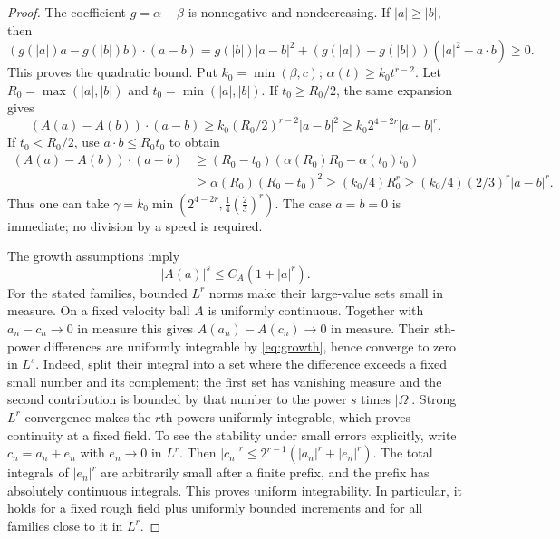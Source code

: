 \documentclass[11pt]{article}
\theoremstyle{remark}
\begin{document}
\begin{proof}
The coefficient $g=\alpha-\beta$ is nonnegative and nondecreasing.
If $|a|\ge|b|$, then
\[
 (g(|a|)a-g(|b|)b)\cdot(a-b)
 =g(|b|)|a-b|^2+(g(|a|)-g(|b|))(|a|^2-a\cdot b)\ge0.
\]
This proves the quadratic bound. Put $k_0=\min(\beta,c)$;
$\alpha(t)\ge k_0t^{r-2}$. Let $R_0=\max(|a|,|b|)$ and
$t_0=\min(|a|,|b|)$. If $t_0\ge R_0/2$, the same expansion gives
\[
 (A(a)-A(b))\cdot(a-b)
 \ge k_0(R_0/2)^{r-2}|a-b|^2
 \ge k_0 2^{4-2r}|a-b|^r.
\]
If $t_0<R_0/2$, use $a\cdot b\le R_0t_0$ to obtain
\begin{align*}
 (A(a)-A(b))\cdot(a-b)
 &\ge(R_0-t_0)(\alpha(R_0)R_0-\alpha(t_0)t_0)\\
 &\ge\alpha(R_0)(R_0-t_0)^2
 \ge(k_0/4)R_0^r
 \ge(k_0/4)(2/3)^r|a-b|^r.
\end{align*}
Thus one can take
$\gamma=k_0\min(2^{4-2r},\tfrac14(\tfrac23)^r)$.
The case $a=b=0$ is immediate; no division by a speed is required.

The growth assumptions imply
\begin{equation}\label{eq:growth}
 |A(a)|^s\le C_A(1+|a|^r).
\end{equation}
For the stated families, bounded $L^r$ norms make their large-value sets
small in measure. On a fixed velocity ball $A$ is uniformly continuous.
Together with $a_n-c_n\to0$ in measure this gives
$A(a_n)-A(c_n)\to0$ in measure. Their $s$th-power differences are
uniformly integrable by \eqref{eq:growth}, hence converge to zero in $L^s$.
Indeed, split their integral into a set where the difference exceeds a
fixed small number and its complement; the first set has vanishing measure
and the second contribution is bounded by that number to the power $s$
times $|\Omega|$.
Strong $L^r$ convergence makes the $r$th powers uniformly integrable,
which proves continuity at a fixed field. To see the stability under
small errors explicitly, write $c_n=a_n+e_n$ with $e_n\to0$ in $L^r$.
Then $|c_n|^r\le2^{r-1}(|a_n|^r+|e_n|^r)$. The total integrals
of $|e_n|^r$ are arbitrarily small after a finite prefix, and the prefix
has absolutely continuous integrals. This proves uniform integrability.
In particular, it holds for a fixed rough field plus uniformly bounded
increments and for all families close to it in $L^r$.
\end{proof}
\end{document}
